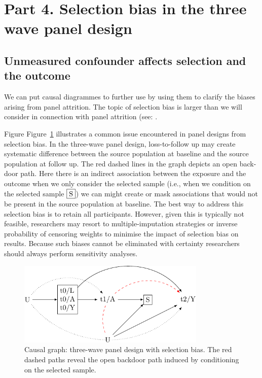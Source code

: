 \documentclass[
  singlecolumn]{report}
\begin{document}
\hypertarget{part-4.-selection-bias-in-the-three-wave-panel-design}{%
\section{Part 4. Selection bias in the three wave panel
design}\label{part-4.-selection-bias-in-the-three-wave-panel-design}}

\hypertarget{unmeasured-confounder-affects-selection-and-the-outcome}{%
\subsection{Unmeasured confounder affects selection and the
outcome}\label{unmeasured-confounder-affects-selection-and-the-outcome}}

We can put causal diagrammes to further use by using them to clarify the
biases arising from panel attrition. The topic of selection bias is
larger than we will consider in connection with panel attrition (see: .

Figure Figure~\ref{fig-dag-8} illustrates a common issue encountered in
panel designs from selection bias. In the three-wave panel design,
loss-to-follow up may create systematic difference between the source
population at baseline and the source population at follow up. The red
dashed lines in the graph depicts an open back-door path. Here there is
an indirect association between the exposure and the outcome when we
only consider the selected sample (i.e., when we condition on the
selected sample \(\framebox{S}\)) we can might create or mask
associations that would not be present in the source population at
baseline. The best way to address this selection bias is to retain all
participants. However, given this is typically not feasible, researchers
may resort to multiple-imputation strategies or inverse probability of
censoring weights to minimise the impact of selection bias on results.
Because such biases cannot be eliminated with certainty researchers
should always perform sensitivity analyses.

\begin{figure}

{\centering \includegraphics[width=0.8\textwidth,height=\textheight]{causal-dags_files/figure-pdf/fig-dag-8-1.pdf}

}

\caption{\label{fig-dag-8}Causal graph: three-wave panel design with
selection bias. The red dashed paths reveal the open backdoor path
induced by conditioning on the selected sample.}

\end{figure}
\end{document}

